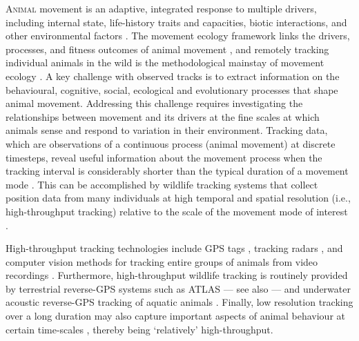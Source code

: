
\newrefcontext[sorting=ynt]

    \lettrine{A}{nimal} movement is an adaptive, integrated response to multiple drivers, including internal state, life-history traits and capacities, biotic interactions, and other environmental factors \citep{nathan2008a, holyoak2008}.
    The movement ecology framework links the drivers, processes, and fitness outcomes of animal movement \citep{nathan2008a}, and remotely tracking individual animals in the wild is the methodological mainstay of movement ecology \citep{wikelski2007,nathan2008a,hussey2015,kays2015}.
    A key challenge with observed tracks is to extract information on the behavioural, cognitive, social, ecological and evolutionary processes that shape animal movement.
    Addressing this challenge requires investigating the relationships between movement and its drivers at the fine scales at which animals sense and respond to variation in their environment. 
    Tracking data, which are observations of a continuous process (animal movement) at discrete timesteps, reveal useful information about the movement process when the tracking interval is considerably shorter than the typical duration of a movement mode \citep{nathan2008a, noonan2019, getz2008}.
    This can be accomplished by wildlife tracking systems that collect position data from many individuals at high temporal and spatial resolution (i.e., high-throughput tracking) relative to the scale of the movement mode of interest \citep{getz2008}.

    High-throughput tracking technologies include GPS tags \citep{strandburg-peshkin2015, papageorgiou2019, harel2016, klarevas-irby2021}, tracking radars \citep{horvitz2014}, and computer vision methods for tracking entire groups of animals from video recordings \citep{rathore2020, perez-escudero2014}. 
    Furthermore, high-throughput wildlife tracking is routinely provided by terrestrial reverse-GPS systems such as ATLAS \citep[Advanced Tracking and Localization of Animals in real-life Systems:][]{toledo2014, weiser2016, toledo2016,toledo2020} --- see also \citep{maccurdy2009, maccurdy2019} --- and underwater acoustic reverse-GPS tracking of aquatic animals \citep{baktoft2019, baktoft2017, jung2015, aspillaga2021, aspillaga2021a}.
    Finally, low resolution tracking over a long duration may also capture important aspects of animal behaviour at certain time-scales \citep[e.g. migration, long-range dispersal;][]{getz2008}, thereby being `relatively' high-throughput.

